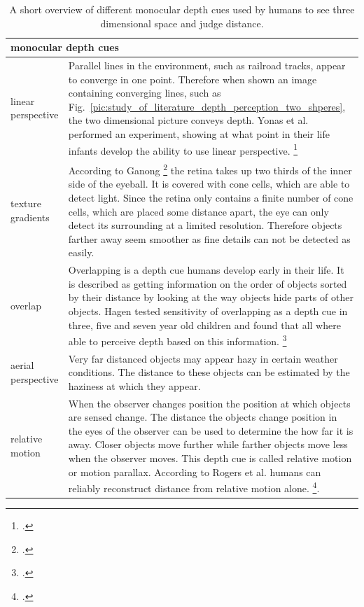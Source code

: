 \begin{table}[h!]
	\begin{tabularx}{\textwidth}{|l|X|}
		\hline
		\multicolumn{2}{|l|}{\textbf{monocular depth cues}} \\
		\hline
		linear perspective & Parallel lines in the environment, such as railroad tracks, appear to converge in one point. Therefore when shown an image containing converging lines, such as Fig.~\ref{pic:study_of_literature_depth_perception_two_shperes}, the two dimensional picture conveys depth. Yonas et al. performed an experiment, showing at what point in their life infants develop the ability to use linear perspective.  \footcite{Yonas_Infants_distance_perception_from_linear_perspective_and_texture_gradients}
		\\
		\hline
		texture gradients & According to Ganong \footcite{Ganong_Review_of_Medical_Physiology} the retina takes up two thirds of the inner side of the eyeball. It is covered with cone cells, which are able to detect light. Since the retina only contains a finite number of cone cells, which are placed some distance apart, the eye can only detect its surrounding at a limited resolution. Therefore objects farther away seem smoother as fine details can not be detected as easily.
		\\
		\hline
		overlap & Overlapping is a depth cue humans develop early in their life. It is described as getting information on the order of objects sorted by their distance by looking at the way objects hide parts of other objects. Hagen tested sensitivity of overlapping as a depth cue in three, five and seven year old children and found that all where able to perceive depth based on this information. \footcite{Hagen_Development_of_ability_to_perceive_and_produce_pictorial_depth_cue_of_overlapping}
		\\
		\hline
		aerial perspective & Very far distanced objects may appear hazy in certain weather conditions. The distance to these objects can be estimated by the haziness at which they appear.
		\\
		\hline
		relative motion & When the observer changes position the position at which objects are sensed change. The distance the objects change position in the eyes of the observer can be used to determine the how far it is away. Closer objects move further while farther objects move less when the observer moves. This depth cue is called relative motion or motion parallax. According to Rogers et al. humans can reliably reconstruct distance from relative motion alone. \footcite{Rogers_Motion_parallax_as_an_independent_cue_for_depth_perception}.
		\\
		\hline
	\end{tabularx}
	\label{tab:study_of_literature_monocular_depth_cues2}
	\caption{A short overview of different monocular depth cues used by humans to see three dimensional space and judge distance.}
\end{table}

